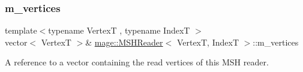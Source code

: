 \subsubsection{\texorpdfstring{m\+\_\+vertices}{m\_vertices}}
{\footnotesize\ttfamily template$<$typename VertexT , typename IndexT $>$ \\
vector$<$ VertexT $>$\& \hyperlink{classmage_1_1_m_s_h_reader}{mage\+::\+M\+S\+H\+Reader}$<$ VertexT, IndexT $>$\+::m\+\_\+vertices\hspace{0.3cm}{\ttfamily [private]}}

A reference to a vector containing the read vertices of this M\+SH reader. 